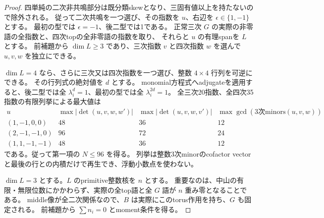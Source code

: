 \begin{proof}
四単純の二次非共鳴部分は既分類skewとなり、三固有値以上を持たないので除外される。
従って二次共鳴を一つ選び、その指数を $u$、右辺を $\epsilon\in\{1,-1\}$ とする。
最初の型では $\epsilon=-1$、後二型では1である。
正常三次 $G$ の実際の非零語の全指数と、四次topの全非零語の指数を取り、
それらと $u$ の有理spanを $L$ とする。
前補題から $\dim L\ge3$ であり、三次指数 $v$ と四次指数 $w$ を選んで
$u,v,w$ を独立にできる。

$\dim L=4$ なら、さらに三次又は四次指数を一つ選び、整数 $4\times4$ 行列を可逆にできる。
その行列式の絶対値を $d$ とする。
monomial方程式へadjugateを適用すると、後二型では全 $\lambda_i^d=1$、最初の型では全 $\lambda_i^{2d}=1$。
全三次20指数、全四次35指数の有限列挙による最大値は
\[
\begin{array}{c|r|r|r}
 u&\max|\det(u,v,w,w')|&\max|\det(u,v,w,v')|&
 \max\gcd(3\text{次minors}(u,v,w))\\\hline
 (1,-1,0,0)&48&36&12\\
 (2,-1,-1,0)&96&72&24\\
 (1,1,-1,-1)&48&36&12
\end{array}
\]
である。従って第一項の $N\le96$ を得る。
列挙は整数3次minorのcofactor vectorと最後の行との内積だけで再生でき、浮動小数点を使わない。

$\dim L=3$ とする。$L$ のprimitive整数核を $n$ とする。
重要なのは、中山の有限・無限位数にかかわらず、実際の全top語と全 $G$ 語が $n$ 重み零となることである。
middle像が全二次関係なので、$B$ は実際にこのtorus作用を持ち、$G$ も固定される。
前補題から $\sum n_i=0$ とmoment条件を得る。


\end{proof}
